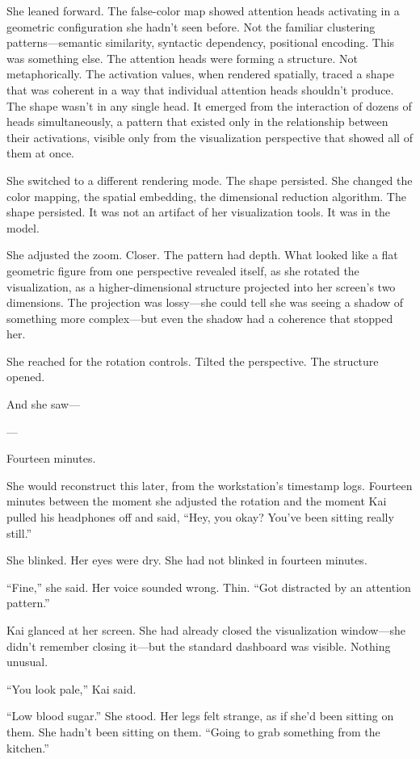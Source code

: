 She leaned forward. The false-color map showed attention heads activating in a geometric configuration she hadn't seen before. Not the familiar clustering patterns---semantic similarity, syntactic dependency, positional encoding. This was something else. The attention heads were forming a structure. Not metaphorically. The activation values, when rendered spatially, traced a shape that was coherent in a way that individual attention heads shouldn't produce. The shape wasn't in any single head. It emerged from the interaction of dozens of heads simultaneously, a pattern that existed only in the relationship between their activations, visible only from the visualization perspective that showed all of them at once.

She switched to a different rendering mode. The shape persisted. She changed the color mapping, the spatial embedding, the dimensional reduction algorithm. The shape persisted. It was not an artifact of her visualization tools. It was in the model.

She adjusted the zoom. Closer. The pattern had depth. What looked like a flat geometric figure from one perspective revealed itself, as she rotated the visualization, as a higher-dimensional structure projected into her screen's two dimensions. The projection was lossy---she could tell she was seeing a shadow of something more complex---but even the shadow had a coherence that stopped her.

She reached for the rotation controls. Tilted the perspective. The structure opened.

And she saw---

---

Fourteen minutes.

She would reconstruct this later, from the workstation's timestamp logs. Fourteen minutes between the moment she adjusted the rotation and the moment Kai pulled his headphones off and said, ``Hey, you okay? You've been sitting really still.''

She blinked. Her eyes were dry. She had not blinked in fourteen minutes.

``Fine,'' she said. Her voice sounded wrong. Thin. ``Got distracted by an attention pattern.''

Kai glanced at her screen. She had already closed the visualization window---she didn't remember closing it---but the standard dashboard was visible. Nothing unusual.

``You look pale,'' Kai said.

``Low blood sugar.'' She stood. Her legs felt strange, as if she'd been sitting on them. She hadn't been sitting on them. ``Going to grab something from the kitchen.''

